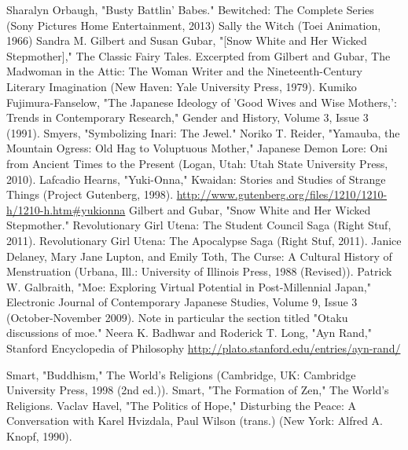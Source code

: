 \begin{thebibliography}{200}
    Sharalyn Orbaugh, "Busty Battlin' Babes."
    Bewitched: The Complete Series (Sony Pictures Home Entertainment, 2013)
    Sally the Witch (Toei Animation, 1966)
    Sandra M. Gilbert and Susan Gubar, "[Snow White and Her Wicked Stepmother]," The Classic Fairy Tales. Excerpted from Gilbert and Gubar, The Madwoman in the Attic: The Woman Writer and the Nineteenth-Century Literary Imagination (New Haven: Yale University Press, 1979).
    Kumiko Fujimura-Fanselow, "The Japanese Ideology of 'Good Wives and Wise Mothers,': Trends in Contemporary Research," Gender and History, Volume 3, Issue 3 (1991).
    Smyers, "Symbolizing Inari: The Jewel."
    Noriko T. Reider, "Yamauba, the Mountain Ogress: Old Hag to Voluptuous Mother," Japanese Demon Lore: Oni from Ancient Times to the Present (Logan, Utah: Utah State University Press, 2010).
    Lafcadio Hearns, "Yuki-Onna," Kwaidan: Stories and Studies of Strange Things (Project Gutenberg, 1998). \url{http://www.gutenberg.org/files/1210/1210-h/1210-h.htm#yukionna}
    Gilbert and Gubar, "Snow White and Her Wicked Stepmother."
    Revolutionary Girl Utena: The Student Council Saga (Right Stuf, 2011).
    Revolutionary Girl Utena: The Apocalypse Saga (Right Stuf, 2011).
    Janice Delaney, Mary Jane Lupton, and Emily Toth, The Curse: A Cultural History of Menstruation (Urbana, Ill.: University of Illinois Press, 1988 (Revised)).
    Patrick W. Galbraith, "Moe: Exploring Virtual Potential in Post-Millennial Japan," Electronic Journal of Contemporary Japanese Studies, Volume 9, Issue 3 (October-November 2009). Note in particular the section titled "Otaku discussions of moe."
    Neera K. Badhwar and Roderick T. Long, "Ayn Rand," Stanford Encyclopedia of Philosophy \url{http://plato.stanford.edu/entries/ayn-rand/}


    Smart, "Buddhism," The World's Religions (Cambridge, UK: Cambridge University Press, 1998 (2nd ed.)).
    Smart, "The Formation of Zen," The World's Religions.
    Vaclav Havel, "The Politics of Hope," Disturbing the Peace: A Conversation with Karel Hvizdala, Paul Wilson (trans.) (New York: Alfred A. Knopf, 1990).



\end{thebibliography}
